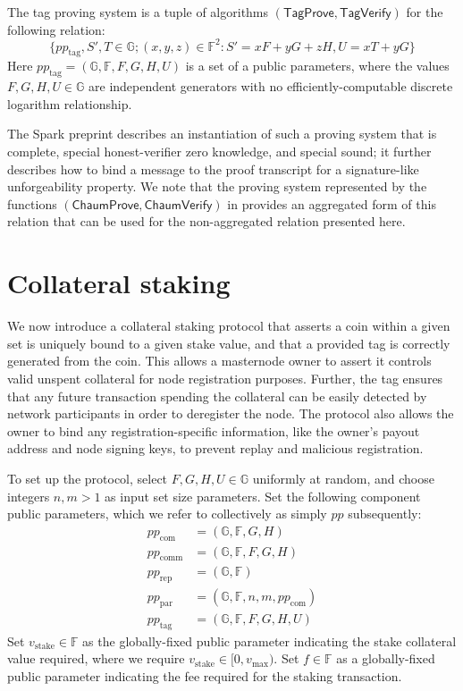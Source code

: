 \documentclass{article}
\newcommand{\G}{\mathbb{G}}
\newcommand{\F}{\mathbb{F}}
\newcommand{\func}[1]{\mathsf{#1}}
\theoremstyle{remark}
\begin{document}
The tag proving system is a tuple of algorithms $(\func{TagProve},\func{TagVerify})$ for the following relation:
$$\{pp_{\text{tag}},S',T \in \G ; (x,y,z) \in \F^2 : S' = xF + yG + zH, U = xT + yG\}$$
Here $pp_{\text{tag}} = (\G,\F,F,G,H,U)$ is a set of a public parameters, where the values $F,G,H,U \in \G$ are independent generators with no efficiently-computable discrete logarithm relationship.

The Spark preprint describes an instantiation of such a proving system that is complete, special honest-verifier zero knowledge, and special sound; it further describes how to bind a message to the proof transcript for a signature-like unforgeability property.
We note that the proving system represented by the functions $(\func{ChaumProve},\func{ChaumVerify})$ in \cite{spark} provides an aggregated form of this relation that can be used for the non-aggregated relation presented here.


\section{Collateral staking}

We now introduce a collateral staking protocol that asserts a coin within a given set is uniquely bound to a given stake value, and that a provided tag is correctly generated from the coin.
This allows a masternode owner to assert it controls valid unspent collateral for node registration purposes.
Further, the tag ensures that any future transaction spending the collateral can be easily detected by network participants in order to deregister the node.
The protocol also allows the owner to bind any registration-specific information, like the owner's payout address and node signing keys, to prevent replay and malicious registration.

To set up the protocol, select $F,G,H,U \in \G$ uniformly at random, and choose integers $n,m > 1$ as input set size parameters.
Set the following component public parameters, which we refer to collectively as simply $pp$ subsequently:
\begin{align*}
    pp_{\text{com}} &= (\G,\F,G,H) \\
    pp_{\text{comm}} &= (\G,\F,F,G,H) \\
    pp_{\text{rep}} &= (\G,\F) \\
    pp_{\text{par}} &= (\G,\F,n,m,pp_{\text{com}}) \\
    pp_{\text{tag}} &= (\G,\F,F,G,H,U)
\end{align*}
Set $v_{\text{stake}} \in \F$ as the globally-fixed public parameter indicating the stake collateral value required, where we require $v_{\text{stake}} \in [0,v_{\text{max}})$.
Set $f \in \F$ as a globally-fixed public parameter indicating the fee required for the staking transaction.
\end{document}
